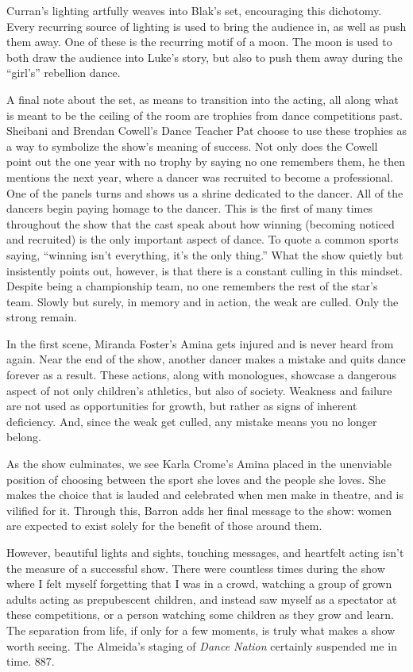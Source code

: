 \documentclass[12pt]{article}[titlepage]
\newcommand{\say}[1]{``#1''}
\newcommand{\1}{\={a}}
\newcommand{\2}{\={e}}
\newcommand{\3}{\={\i}}
\newcommand{\4}{\=o}
\newcommand{\5}{\=u}
\newcommand{\6}{\={A}}
\renewcommand{\,}{\textsuperscript{,}}
\begin{document}
Curran's lighting artfully weaves into Blak's set, encouraging this dichotomy.
Every recurring source of lighting is used to bring the audience in, as well as push them away.
One of these is the recurring motif of a moon.
The moon is used to both draw the audience into Luke's story, but also to push them away during the \say{girl's} rebellion dance.

A final note about the set, as means to transition into the acting, all along what is meant to be the ceiling of the room are trophies from dance competitions past.
Sheibani and Brendan Cowell's Dance Teacher Pat choose to use these trophies as a way to symbolize the show's meaning of success.
Not only does the Cowell point out the one year with no trophy by saying no one remembers them, he then mentions the next year, where a dancer was recruited to become a professional.
One of the panels turns and shows us a shrine dedicated to the dancer.
All of the dancers begin paying homage to the dancer.
This is the first of many times throughout the show that the cast speak about how winning (becoming noticed and recruited) is the only important aspect of dance.
To quote a common sports saying, \say{winning isn't everything, it's the only thing.}
What the show quietly but insistently points out, however, is that there is a constant culling in this mindset.
Despite being a championship team, no one remembers the rest of the star's team.
Slowly but surely, in memory and in action, the weak are culled.
Only the strong remain.

In the first scene, Miranda Foster's Amina gets injured and is never heard from again.
Near the end of the show, another dancer makes a mistake and quits dance forever as a result.
These actions, along with monologues, showcase a dangerous aspect of not only children's athletics, but also of society.
Weakness and failure are not used as opportunities for growth, but rather as signs of inherent deficiency.
And, since the weak get culled, any mistake means you no longer belong.

As the show culminates, we see Karla Crome's Amina placed in the unenviable position of choosing between the sport she loves and the people she loves.
She makes the choice that is lauded and celebrated when men make in theatre, and is vilified for it.
Through this, Barron adds her final message to the show: women are expected to exist solely for the benefit of those around them.

However, beautiful lights and sights, touching messages, and heartfelt acting isn't the measure of a successful show.
There were countless times during the show where I felt myself forgetting that I was in a crowd, watching a group of grown adults acting as prepubescent children, and instead saw myself as a spectator at these competitions, or a person watching some children as they grow and learn.
The separation from life, if only for a few moments, is truly what makes a show worth seeing.
The Almeida's staging of \textit{Dance Nation} certainly suspended me in time.
887.
\end{document}
